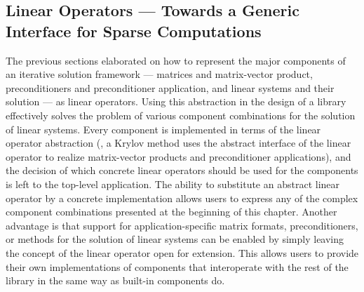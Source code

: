 \subsection{Linear Operators --- Towards a Generic Interface for Sparse
            Computations}
The previous sections elaborated on how to represent the major components of an
iterative solution framework --- matrices and matrix-vector product,
preconditioners and preconditioner application, and linear systems and their
solution --- as linear operators. Using this abstraction in the design of a
library effectively solves the problem of various component combinations for the
solution of linear systems.  Every component is implemented in terms of the
linear operator abstraction (\eg, a Krylov method uses the abstract interface of
the linear operator to realize matrix-vector products and preconditioner
applications), and the decision of which concrete linear operators should be
used for the components is left to the top-level application. The ability to
substitute an abstract linear operator by a concrete implementation allows
users to express any of the complex component combinations presented at the
beginning of this chapter. Another advantage is that support for
application-specific matrix formats, preconditioners, or methods for the
solution of linear systems can be enabled by simply leaving the concept of the
linear operator open for extension. This allows users to provide their own
implementations of components that interoperate with the rest of the library in
the same way as built-in components do.

